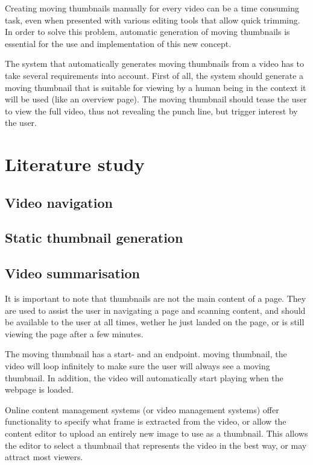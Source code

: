 \documentclass{../resources/acm_proc_article-sp}
\begin{document}
Creating moving thumbnails manually for every video can be a time consuming task, even when presented with various editing tools that allow quick trimming. In order to solve this problem,  automatic generation of moving thumbnails is essential for the use and implementation of this new concept.

The system that automatically generates moving thumbnails from a video has to take several requirements into account. First of all, the system should generate a moving thumbnail that is suitable for viewing by a human being in the context it will be used (like an overview page). The moving thumbnail should tease the user to view the full video, thus not revealing the punch line, but trigger interest by the user.



\section{Literature study}

\subsection{Video navigation}

\subsection{Static thumbnail generation}

\subsection{Video summarisation}


It is important to note that thumbnails are not the main content of a page. They are used to assist the user in navigating a page and scanning content, and should be available to the user at all times, wether he just landed on the page, or is still viewing the page after a few minutes.


The moving thumbnail has a start- and an endpoint. moving thumbnail, the video will loop infinitely to make sure the user will always see a moving thumbnail. In addition, the video will automatically start playing when the webpage is loaded.

Online content management systems (or video management systems) offer functionality to specify what frame is extracted from the video, or allow the content editor to upload an entirely new image to use as a thumbnail. This allows the editor to select a thumbnail that represents the video in the best way, or may attract most viewers.
\end{document}
